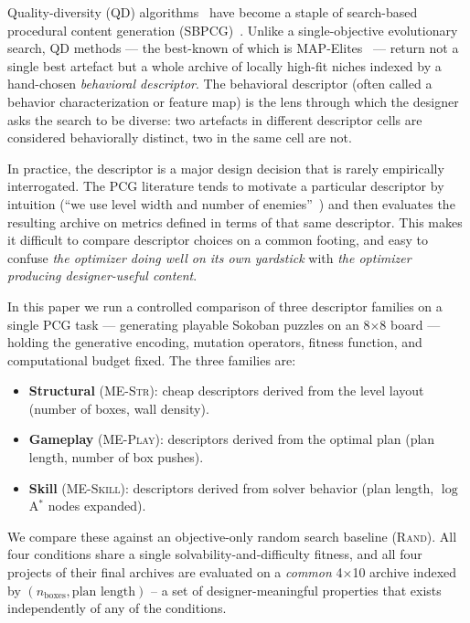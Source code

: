 \documentclass[conference]{IEEEtran}
\begin{document}
Quality-diversity (QD) algorithms~\cite{mouret2015illuminating,
cully2017qd} have become a staple of search-based procedural content
generation (SBPCG)~\cite{togelius2011sbpcg,gravina2019pcgsurvey}.
Unlike a single-objective evolutionary search, QD methods --- the
best-known of which is MAP-Elites~\cite{mouret2015illuminating} ---
return not a single best artefact but a whole archive of locally
high-fit niches indexed by a hand-chosen \emph{behavioral
descriptor}. The behavioral descriptor (often called a behavior
characterization or feature map) is the lens through which the
designer asks the search to be diverse: two artefacts in different
descriptor cells are considered behaviorally distinct, two in the
same cell are not.

In practice, the descriptor is a major design decision that is rarely
empirically interrogated. The PCG literature tends to motivate a
particular descriptor by intuition (``we use level width and number
of enemies''~\cite{khalifa2018talakat}) and then evaluates the
resulting archive on metrics defined in terms of that same
descriptor. This makes it difficult to compare descriptor choices on
a common footing, and easy to confuse \emph{the optimizer doing well
on its own yardstick} with \emph{the optimizer producing
designer-useful content}.

In this paper we run a controlled comparison of three descriptor
families on a single PCG task --- generating playable Sokoban puzzles
on an 8$\times$8 board --- holding the generative encoding, mutation
operators, fitness function, and computational budget fixed. The
three families are:
\begin{itemize}
    \item \textbf{Structural} (\textsc{ME-Str}): cheap descriptors
    derived from the level layout (number of boxes, wall density).
    \item \textbf{Gameplay} (\textsc{ME-Play}): descriptors derived
    from the optimal plan (plan length, number of box pushes).
    \item \textbf{Skill} (\textsc{ME-Skill}): descriptors derived
    from solver behavior (plan length, $\log$ A$^*$ nodes expanded).
\end{itemize}
We compare these against an objective-only random search baseline
(\textsc{Rand}). All four conditions share a single
solvability-and-difficulty fitness, and all four projects of their
final archives are evaluated on a \emph{common} 4$\times$10 archive
indexed by $(n_\text{boxes}, \text{plan length})$ -- a set of
designer-meaningful properties that exists independently of any of
the conditions.
\end{document}
